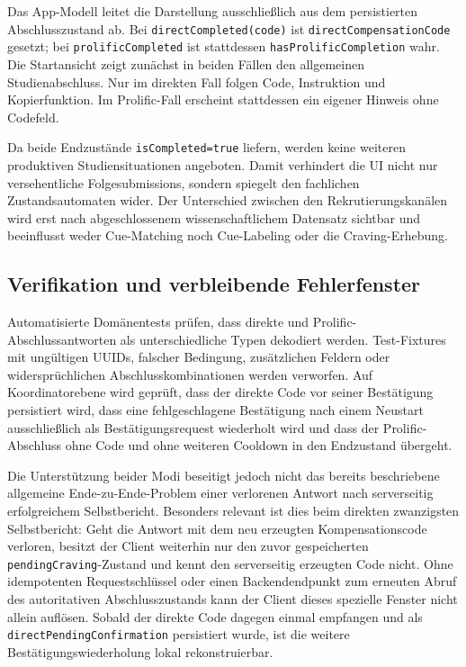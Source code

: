 \begin{neu}
Das App-Modell leitet die Darstellung ausschließlich aus dem persistierten Abschlusszustand ab. Bei \texttt{directCompleted(code)} ist \texttt{directCompensationCode} gesetzt; bei \texttt{prolificCompleted} ist stattdessen \texttt{hasProlificCompletion} wahr. Die Startansicht zeigt zunächst in beiden Fällen den allgemeinen Studienabschluss. Nur im direkten Fall folgen Code, Instruktion und Kopierfunktion. Im Prolific-Fall erscheint stattdessen ein eigener Hinweis ohne Codefeld.

Da beide Endzustände \texttt{isCompleted=true} liefern, werden keine weiteren produktiven Studiensituationen angeboten. Damit verhindert die UI nicht nur versehentliche Folgesubmissions, sondern spiegelt den fachlichen Zustandsautomaten wider. Der Unterschied zwischen den Rekrutierungskanälen wird erst nach abgeschlossenem wissenschaftlichem Datensatz sichtbar und beeinflusst weder Cue-Matching noch Cue-Labeling oder die Craving-Erhebung.

\subsection{Verifikation und verbleibende Fehlerfenster}

Automatisierte Domänentests prüfen, dass direkte und Prolific-Abschlussantworten als unterschiedliche Typen dekodiert werden. Test-Fixtures mit ungültigen UUIDs, falscher Bedingung, zusätzlichen Feldern oder widersprüchlichen Abschlusskombinationen werden verworfen. Auf Koordinatorebene wird geprüft, dass der direkte Code vor seiner Bestätigung persistiert wird, dass eine fehlgeschlagene Bestätigung nach einem Neustart ausschließlich als Bestätigungsrequest wiederholt wird und dass der Prolific-Abschluss ohne Code und ohne weiteren Cooldown in den Endzustand übergeht.

Die Unterstützung beider Modi beseitigt jedoch nicht das bereits beschriebene allgemeine Ende-zu-Ende-Problem einer verlorenen Antwort nach serverseitig erfolgreichem Selbstbericht. Besonders relevant ist dies beim direkten zwanzigsten Selbstbericht: Geht die Antwort mit dem neu erzeugten Kompensationscode verloren, besitzt der Client weiterhin nur den zuvor gespeicherten \texttt{pendingCraving}-Zustand und kennt den serverseitig erzeugten Code nicht. Ohne idempotenten Requestschlüssel oder einen Backendendpunkt zum erneuten Abruf des autoritativen Abschlusszustands kann der Client dieses spezielle Fenster nicht allein auflösen. Sobald der direkte Code dagegen einmal empfangen und als \texttt{directPendingConfirmation} persistiert wurde, ist die weitere Bestätigungswiederholung lokal rekonstruierbar.


\end{neu}
